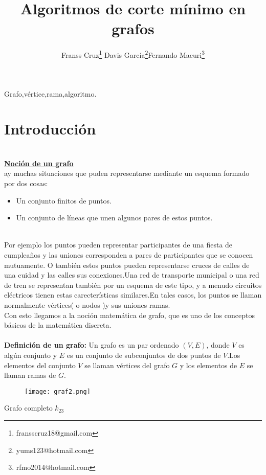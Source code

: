 \documentclass[a4,papper]{IEEEtran}
\title{Algoritmos de corte mínimo en grafos}
\author{Franss Cruz\quad\thanks{fransscruz18@gmail.com}
Davis García\quad\thanks{yums123@hotmail.com}Fernando Macuri\quad\thanks{rfmo2014@hotmail.com}}
\begin{document}
\maketitle
\begin{IEEEkeywords}
Grafo,vértice,rama,algoritmo.
\end{IEEEkeywords}
\section{Introducción}
\ \\[1pt]
{\large \bf \underline{Noción de un grafo}}\\
ay muchas situaciones que puden representarse mediante un esquema formado por dos cosas:
\begin{itemize}[]
\item Un conjunto finitos de puntos.
\item Un conjunto de líneas que unen algunos pares de estos puntos.
\end{itemize}\\

\noindent Por ejemplo los puntos pueden representar participantes de una fiesta de cumpleaños y las uniones corresponden a pares de participantes que se conocen mutuamente. O también estos puntos pueden representarse cruces de calles de una cuidad y las calles sus conexiones.Una red de transporte municipal o una red de tren se representan también por un esquema de este tipo, y a menudo circuitos eléctricos tienen estas carecterísticas similares.En tales casos, los puntos se llaman normalmente vértices( o nodos )y sus uniones ramas.\\
Con esto llegamos a la noción matemática de grafo, que es uno de los conceptos básicos de la matemática discreta.\\
\ \\[1mm]
{\large \bf {Definición de un grafo:}}
Un grafo es un par ordenado $(V,E)$, donde $V$ es algún conjunto y $E$ es un conjunto de subconjuntos de dos puntos de $V$.Los elementos del conjunto $V$ se llaman vértices del grafo $G$ y los elementos de $E$ se llaman ramas de $G$. \\

\begin{figure}[H]
    \centering
    \texttt{[image: graf2.png]}
\end{figure}   
\begin{center}
Grafo completo $k_{23}$
\end{center}
\end{document}
